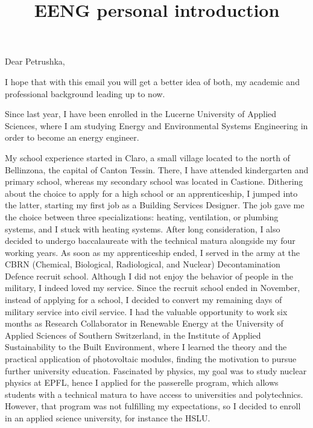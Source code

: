 \documentclass{article}
\title{\textbf{EENG personal introduction}}
\date{}
\begin{document}
\maketitle
\vspace*{-1.5cm}

Dear Petrushka,
\setlength{\parskip}{1.5em}

I hope that with this email you will get a better idea of both, my academic
and professional background leading up to now.
\setlength{\parskip}{.3em}

Since last year, I have been enrolled in the Lucerne University of Applied Sciences, where I
am studying Energy and Environmental Systems Engineering in order to become an energy engineer.
\setlength{\parskip}{1em}

My school experience started in Claro, a small village located to the north of Bellinzona,
the capital of Canton Tessin. There, I have attended kindergarten and primary school,
whereas my secondary school was located in Castione.
Dithering about the choice to apply for a high school or an apprenticeship, I jumped into
the latter, starting my first job as a Building Services Designer. The job gave me the
choice between three specializations: heating, ventilation, or plumbing systems,
and I stuck with heating systems. After long consideration, I also decided to undergo
baccalaureate with the technical matura alongside my four working years.
As soon as my apprenticeship ended, I served in the army at the CBRN
(Chemical, Biological, Radiological, and Nuclear) Decontamination Defence recruit school.
Although I did not enjoy the behavior of people in the military, I indeed loved my service.
Since the recruit school ended in November, instead of applying for a school, I decided to
convert my remaining days of military service into civil service.
I had the valuable opportunity to work six months as Research Collaborator in Renewable Energy
at the University of Applied Sciences of Southern Switzerland, in the Institute
of Applied Sustainability to the Built Environment, where I learned the theory and the
practical application of photovoltaic modules, finding the motivation to pursue further
university education.
Fascinated by physics, my goal was to study nuclear physics at EPFL, hence I applied for
the passerelle program, which allows students with a technical matura to have access to
universities and polytechnics. However, that program was not fulfilling my expectations,
so I decided to enroll in an applied science university, for instance the HSLU.
\end{document}
